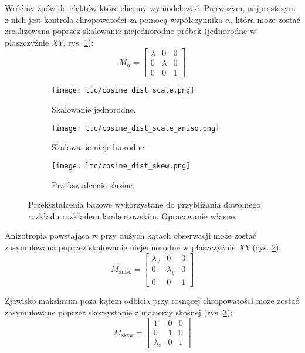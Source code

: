 \documentclass[../main.tex]{subfiles}
\begin{document}
Wróćmy znów do efektów które chcemy wymodelować. Pierwszym, najprostszym z nich jest kontrola chropowatości za pomocą współczynnika $\alpha$, która może zostać zrealizowana poprzez skalowanie niejednorodne próbek (jednorodne w płaszczyźnie $XY$, rys. \ref{fig:LTCEqualScale}):
\[
M_{\alpha} =
\begin{bmatrix}
  \lambda & 0 & 0 \\
  0 & \lambda & 0 \\
  0 & 0 & 1
\end{bmatrix}
\]

\begin{figure}[h]
\centering
    \begin{subfigure}[t]{0.25\textwidth}
        \texttt{[image: ltc/cosine\_dist\_scale.png]}
        \caption{Skalowanie jednorodne.}
        \label{fig:LTCEqualScale}
    \end{subfigure}
    \hspace{0.03\textwidth}
    \begin{subfigure}[t]{0.25\textwidth}
        \centering
        \texttt{[image: ltc/cosine\_dist\_scale\_aniso.png]}
        \caption{Skalowanie niejednorodne.}
        \label{fig:LTCAnisoScale}
    \end{subfigure}
    \hspace{0.03\textwidth}
    \begin{subfigure}[t]{0.25\textwidth}
        \centering
        \texttt{[image: ltc/cosine\_dist\_skew.png]}
        \caption{Przekształcenie skośne.}
        \label{fig:LTCSkew}
    \end{subfigure}
    \caption{Przekształcenia bazowe wykorzystane do przybliżania dowolnego rozkładu rozkładem lambertowskim. Opracowanie własne.}
    \label{fig:LTCTransforms}
\end{figure}

Anizotropia powstająca w przy dużych kątach obserwacji może zostać zasymulowana poprzez skalowanie niejednorodne w płaszczyźnie $XY$ (rys. \ref{fig:LTCAnisoScale}):
\[
M_{\text{aniso}} =
\begin{bmatrix}
  \lambda_x & 0 & 0 \\
  0 & \lambda_y & 0 \\
  0 & 0 & 1
\end{bmatrix}
\]



Zjawisko maksimum poza kątem odbicia przy rosnącej chropowatości może zostać zasymulowane poprzez skorzystanie z macierzy skośnej (rys. \ref{fig:LTCSkew}):
\[
M_{\text{skew}} =
\begin{bmatrix}
  1 & 0 & 0 \\
  0 & 1 & 0 \\
  \lambda_{s} & 0 & 1
\end{bmatrix}
\]
\end{document}

